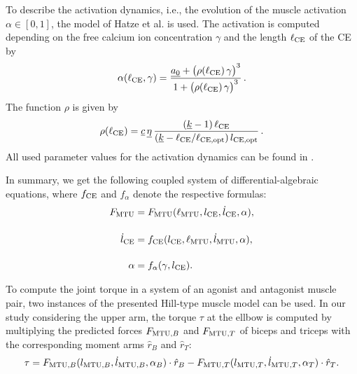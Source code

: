 To describe the activation dynamics, i.e., the evolution of the muscle activation ${\alpha \in [0,1]}$, the model of Hatze et al. \cite{Hatze1977} is used.
The activation is computed depending on the free calcium ion concentration $\gamma$ and the length $\ell_{\text{CE}}$ of the CE by
\begin{equation*}
  \begin{array}{lll}
    \alpha(\ell_{\text{CE}},\gamma) = \displaystyle\frac{\displaystyle{\underline{a_0} + \big(\rho(\ell_{\text{CE}})\,\gamma\big)^3}}{\displaystyle{1 + \big(\rho(\ell_{\text{CE}})\,\gamma\big)^3}}\,.
  \end{array}
\end{equation*}
The function $\rho$ is given by
\begin{equation*}
  \begin{array}{lll}
    \rho(\ell_{\text{CE}}) = \underline{c}\,\underline{\eta}\,\displaystyle\frac{\displaystyle{(\underline{k}-1)\,\ell_{\text{CE}}}}{\displaystyle{(\underline{k} - \ell_{\text{CE}}/\ell_\text{CE,opt})\,l_\text{CE,opt}}}\,.
  \end{array}
\end{equation*}
All used parameter values for the activation dynamics can be found in \cite{Bayer2017}.

In summary, we get the following coupled system of differential-algebraic equations, where $f_{\text{CE}}$ and $f_\alpha$ denote the respective formulas:
\begin{align}
  F_{\text{MTU}} &= F_{\text{MTU}}(\ell_{\text{MTU}},l_{\text{CE}},\dot{l}_{\text{CE}},\alpha),      \label{eq:hill_type1} \\[4mm]
  \dot{l}_{\text{CE}} &= f_{\text{CE}}(l_{\text{CE}},\ell_{\text{MTU}},\dot{l}_{\text{MTU}},\alpha), \label{eq:hill_type2}\\[4mm]
  \alpha &= f_\alpha(\gamma, l_{\text{CE}}).                      \label{eq:hill_type3}
\end{align}

To compute the joint torque in a system of an agonist and antagonist muscle pair, two instances of the presented Hill-type muscle model can be used. In our study considering the upper arm, the torque $\tau$ at the ellbow is computed by multiplying the predicted forces $F_{\text{MTU},B}$ and $F_{\text{MTU},T}$ of biceps and triceps with the corresponding moment arms $\hat{r}_B$ and $\hat{r}_T$:
\begin{equation}\label{eq:muscle_torque}
  \begin{array}{lll}
    \tau = F_{\text{MTU},B}(l_{\text{MTU},B},\dot{l}_{\text{MTU},B},\alpha_B) \cdot \hat{r}_B - F_{\text{MTU},T}(l_{\text{MTU},T},\dot{l}_{\text{MTU},T},\alpha_T) \cdot \hat{r}_T.
  \end{array}
\end{equation}

